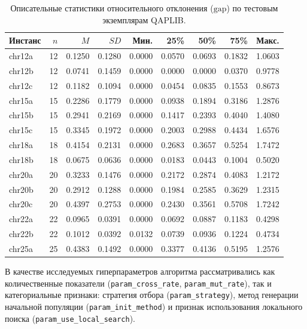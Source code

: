 \documentclass[732]{studrep}
\theoremstyle{nonumberplain}
\begin{document}
\begin{table}[H]
\caption{Описательные статистики относительного отклонения (\(\mathrm{gap}\)) по тестовым экземплярам QAPLIB.}
\label{tab:gap_by_instance}
\centering
\begin{tabular}{@{} l r r r r r r r r @{}}
\hline
Инстанс & \(n\) & \(M\) & \(SD\) & Мин. & 25\% & 50\% & 75\% & Макс. \\
\hline
chr12a & 12 & 0.1250 & 0.1280 & 0.0000 & 0.0570 & 0.0693 & 0.1832 & 1.0603 \\
chr12b & 12 & 0.0741 & 0.1459 & 0.0000 & 0.0000 & 0.0000 & 0.0370 & 0.9778 \\
chr12c & 12 & 0.1182 & 0.1094 & 0.0000 & 0.0454 & 0.0835 & 0.1553 & 0.8673 \\
chr15a & 15 & 0.2286 & 0.1779 & 0.0000 & 0.0938 & 0.1894 & 0.3186 & 1.2876 \\
chr15b & 15 & 0.2941 & 0.2169 & 0.0000 & 0.1417 & 0.2393 & 0.4040 & 1.4080 \\
chr15c & 15 & 0.3345 & 0.1972 & 0.0000 & 0.2003 & 0.2988 & 0.4434 & 1.6576 \\
chr18a & 18 & 0.4154 & 0.2131 & 0.0000 & 0.2683 & 0.3657 & 0.5254 & 1.7472 \\
chr18b & 18 & 0.0675 & 0.0636 & 0.0000 & 0.0183 & 0.0443 & 0.1004 & 0.5020 \\
chr20a & 20 & 0.3233 & 0.1476 & 0.0000 & 0.2172 & 0.2874 & 0.4083 & 1.2172 \\
chr20b & 20 & 0.2912 & 0.1288 & 0.0000 & 0.1984 & 0.2585 & 0.3629 & 1.2315 \\
chr20c & 20 & 0.4397 & 0.2753 & 0.0000 & 0.2430 & 0.3561 & 0.5708 & 1.7242 \\
chr22a & 22 & 0.0965 & 0.0391 & 0.0000 & 0.0692 & 0.0887 & 0.1183 & 0.4298 \\
chr22b & 22 & 0.1012 & 0.0392 & 0.0132 & 0.0739 & 0.0936 & 0.1224 & 0.4734 \\
chr25a & 25 & 0.4383 & 0.1492 & 0.0000 & 0.3377 & 0.4136 & 0.5195 & 1.2576 \\
\hline
\end{tabular}
\end{table}

В качестве исследуемых гиперпараметров алгоритма рассматривались как количественные показатели (\texttt{param\_cross\_rate}, \texttt{param\_mut\_rate}), так и категориальные признаки: стратегия отбора (\texttt{param\_strategy}), метод генерации начальной популяции (\texttt{param\_init\_method}) и признак использования локального поиска (\texttt{param\_use\_local\_search}).
\end{document}
